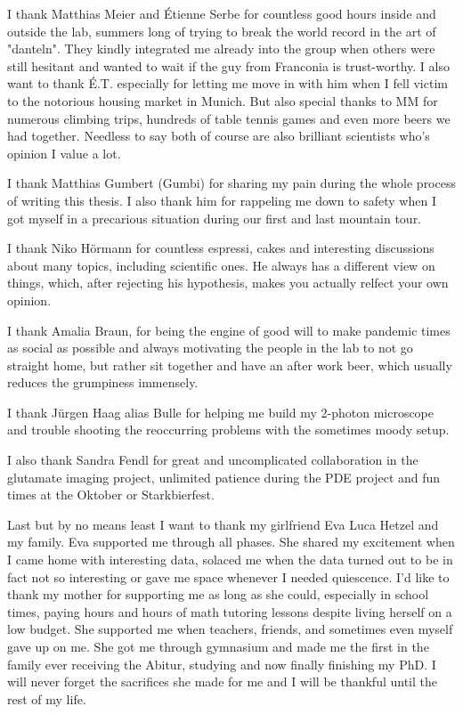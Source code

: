 I thank Matthias Meier and Étienne Serbe for countless good hours inside and outside the lab, summers long of trying to break the world record in the art of "danteln". They kindly integrated me already into the group when others were still hesitant and wanted to wait if the guy from Franconia is trust-worthy. I also want to thank É.T. especially for letting me move in with him when I fell victim to the notorious housing market in Munich. But also special thanks to MM for numerous climbing trips, hundreds of table tennis games and even more beers we had together. Needless to say both of course are also brilliant scientists who's opinion I value a lot. 

I thank Matthias Gumbert (Gumbi) for sharing my pain during the whole process of writing this thesis. I also thank him for rappeling me down to safety when I got myself in a precarious situation during our first and last mountain tour. 

I thank Niko Hörmann for countless espressi, cakes and interesting discussions about many topics, including scientific ones. He always has a different view on things, which, after rejecting his hypothesis, makes you actually relfect your own opinion. 

I thank Amalia Braun, for being the engine of good will to make pandemic times as social as possible and always motivating the people in the lab to not go straight home, but rather sit together and have an after work beer, which usually reduces the grumpiness immensely. 

I thank Jürgen Haag alias Bulle for helping me build my 2-photon microscope and trouble shooting the reoccurring problems with the sometimes moody setup. 

I also thank Sandra Fendl for great and uncomplicated collaboration in the glutamate imaging project, unlimited patience during the PDE project and fun times at the Oktober or Starkbierfest.

Last but by no means least I want to thank my girlfriend Eva Luca Hetzel and my family. Eva supported me through all phases. She shared my excitement when I came home with interesting data, solaced me when the data turned out to be in fact not so interesting or gave me space whenever I needed quiescence. I'd like to thank my mother for supporting me as long as she could, especially in school times, paying hours and hours of math tutoring lessons despite living herself on a low budget. She supported me when teachers, friends, and sometimes even myself gave up on me. She got me through gymnasium and made me the first in the family ever receiving the Abitur, studying and now finally finishing my PhD. I will never forget the sacrifices she made for me and I will be thankful until the rest of my life. 



\endgroup



